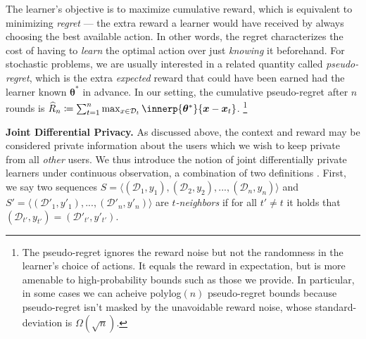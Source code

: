 \documentclass{article}
\newcommand{\os}[1]{\textcolor{red}{Or's comment:~\textbf{#1}}}
\renewcommand{\vec}[1]{\bm{#1}}
\newcommand{\defeq}{\coloneq}
\newcommand{\D}{\mathcal{D}}
\renewcommand{\paragraph}[1]{\vspace{2pt}\noindent\textbf{#1}}
\begin{document}
The learner's objective is to maximize cumulative reward, which is equivalent to
minimizing \emph{regret} --- the extra reward a
learner would have received by always choosing the best available
action.
In other words, the regret characterizes the cost of having
to \emph{learn} the optimal action over just \emph{knowing} it beforehand.
For stochastic problems, we are usually interested in a related
quantity called \emph{pseudo-regret}, which is the extra
\emph{expected} reward that could have been earned had the learner known $\vec\theta^*$ in advance.  In our setting,
the cumulative pseudo-regret after $n$ rounds is
$\widehat{R}_n \defeq
\sum_{t=1}^n\max_{x\in\D_t}\innerp{\vec\theta^*}{\vec x - \vec x_t}$.%
\footnote{The pseudo-regret ignores the reward noise but not the
  randomness in the learner's choice of actions.  It equals the reward
  in expectation, but is more amenable to high-probability bounds such
  as those we provide. In particular, in some cases we can acheive polylog$(n)$ pseudo-regret bounds because pseudo-regret isn't masked by the
  unavoidable reward noise, whose standard-deviation is $\Omega(\sqrt n)$.}


\paragraph{Joint Differential Privacy.} %
As discussed above, the context and reward may be considered private
information about the users which we wish to keep private from all
\emph{other} users. We thus introduce the notion of joint
differentially private learners under continuous observation, a
combination of two definitions \citep[given
in][]{KearnsMechanismDesign2014,DworkContinualObservation2010}. First,
we say two sequences
$S = \langle (\mathcal{D}_1, y_1), (\mathcal{D}_2, y_2), ...,
(\mathcal{D}_n, y_n) \rangle$ and
$S' = \langle (\mathcal{D}'_1, y'_1), ..., (\mathcal{D}'_n, y'_n)
\rangle$ are \emph{$t$-neighbors} if for all $t'\neq t$ it holds that
$(\mathcal{D}_{t'},y_{t'}) = (\mathcal{D}'_{t'}, y'_{t'})$.
\end{document}
